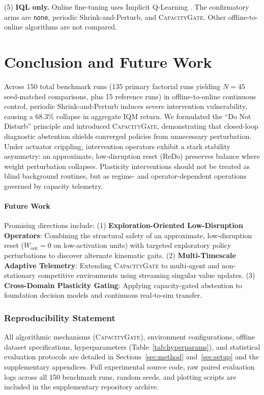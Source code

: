 \documentclass{article}
\begin{document}
(5) \textbf{IQL only.} Online fine-tuning uses Implicit Q-Learning \citep{kostrikov2021iql}. The confirmatory arms are \texttt{none}, periodic Shrink-and-Perturb, and \textsc{CapacityGate}. Other offline-to-online algorithms are not compared.

\section{Conclusion and Future Work}
\label{sec:conclusion}

Across 150 total benchmark runs (135 primary factorial runs yielding $N = 45$ seed-matched comparisons, plus 15 reference runs) in offline-to-online continuous control, periodic Shrink-and-Perturb induces severe intervention vulnerability, causing a 68.3\% collapse in aggregate IQM return. We formulated the ``Do Not Disturb'' principle and introduced \textsc{CapacityGate}, demonstrating that closed-loop diagnostic abstention shields converged policies from unnecessary perturbation. Under actuator crippling, intervention operators exhibit a stark stability asymmetry: an approximate, low-disruption reset (ReDo) preserves balance where weight perturbation collapses. Plasticity interventions should not be treated as blind background routines, but as regime- and operator-dependent operations governed by capacity telemetry.

\paragraph{Future Work}
Promising directions include:
(1) \textbf{Exploration-Oriented Low-Disruption Operators}: Combining the structural safety of an approximate, low-disruption reset ($W_{\mathrm{out}} = 0$ on low-activation units) with targeted exploratory policy perturbations to discover alternate kinematic gaits.
(2) \textbf{Multi-Timescale Adaptive Telemetry}: Extending \textsc{CapacityGate} to multi-agent and non-stationary competitive environments using streaming singular value updates.
(3) \textbf{Cross-Domain Plasticity Gating}: Applying capacity-gated abstention to foundation decision models and continuous real-to-sim transfer.

\subsubsection*{Reproducibility Statement}
All algorithmic mechanisms (\textsc{CapacityGate}), environment configurations, offline dataset specifications, hyperparameters (Table~\ref{tab:hyperparams}), and statistical evaluation protocols are detailed in Sections~\ref{sec:method} and~\ref{sec:setup} and the supplementary appendices. Full experimental source code, raw paired evaluation logs across all 150 benchmark runs, random seeds, and plotting scripts are included in the supplementary repository archive.
\end{document}

